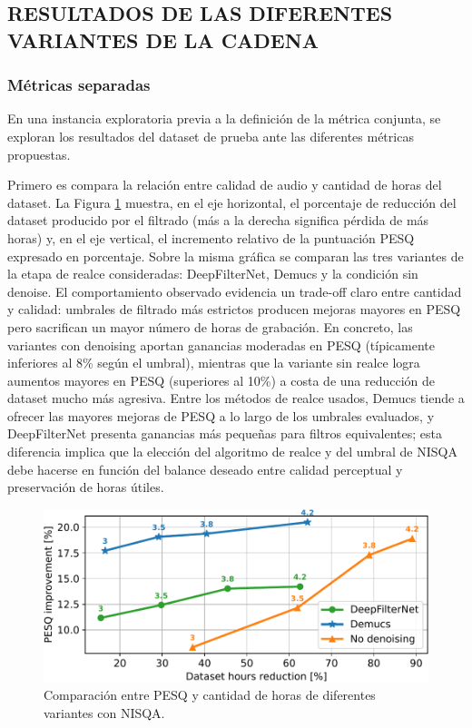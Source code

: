 \subsection{RESULTADOS DE LAS DIFERENTES VARIANTES DE LA CADENA}
\subsubsection{Métricas separadas}
En una instancia exploratoria previa a la definición de la métrica conjunta, se exploran los resultados del dataset de prueba ante las diferentes métricas propuestas.

Primero es compara la relación entre calidad de audio y cantidad de horas del dataset. La Figura \ref{fig:horas_vs_pesq} muestra, en el eje horizontal, el porcentaje de reducción del dataset producido por el filtrado (más a la derecha significa pérdida de más horas) y, en el eje vertical, el incremento relativo de la puntuación PESQ expresado en porcentaje. Sobre la misma gráfica se comparan las tres variantes de la etapa de realce consideradas: DeepFilterNet, Demucs y la condición sin denoise. El comportamiento observado evidencia un trade-off claro entre cantidad y calidad: umbrales de filtrado más estrictos producen mejoras mayores en PESQ pero sacrifican un mayor número de horas de grabación. En concreto, las variantes con denoising aportan ganancias moderadas en PESQ (típicamente inferiores al 8\% según el umbral), mientras que la variante sin realce logra aumentos mayores en PESQ (superiores al 10\%) a costa de una reducción de dataset mucho más agresiva. Entre los métodos de realce usados, Demucs tiende a ofrecer las mayores mejoras de PESQ a lo largo de los umbrales evaluados, y DeepFilterNet presenta ganancias más pequeñas para filtros equivalentes; esta diferencia implica que la elección del algoritmo de realce y del umbral de NISQA debe hacerse en función del balance deseado entre calidad perceptual y preservación de horas útiles.

\begin{figure}[h]
  \centering
  \centerline{\includegraphics[width=12cm]{Figuras/Pipeline/pesq vs horas bien.pdf}}
  \caption{Comparación entre PESQ y cantidad de horas de diferentes variantes con NISQA.}
    \label{fig:horas_vs_pesq}
\end{figure}

